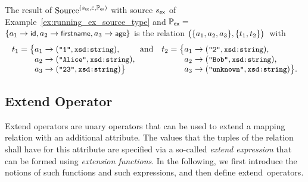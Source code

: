 \begin{example}
	\label{ex:source_operator}
	The result of $\textrm{Source}^{(s_\mathsf{ex},\varepsilon,\mathbb{P}_\mathsf{ex})}$ with
		source
	$s_\mathsf{ex}$ of Example~\ref{ex:running_ex_source_type} and
		$\mathbb{P}_\mathsf{ex} =$ $\{a_1 \rightarrow \textsf{\small id}, a_2 \rightarrow \textsf{\small firstname}, a_3 \rightarrow \textsf{\small age}\}$
	is the
	relation $\big(\{ a_1, a_2, a_3\}, \{t_1,t_2\}\big)$~with%
%
\vspace{-2mm} %
%
	\begin{align*}
		t_1 = \big\{
		& a_1 \rightarrow (\texttt{\small "1"}, \texttt{\small xsd:string}),
		\quad \text{~~~~and}
		&
		t_2 = \big\{
		& a_1 \rightarrow (\texttt{\small "2"}, \texttt{\small xsd:string}),
		\\[-1mm]
		& a_2 \rightarrow (\texttt{\small "Alice"}, \texttt{\small xsd:string}),
		&
		& a_2 \rightarrow (\texttt{\small "Bob"}, \texttt{\small xsd:string}),
		\\[-1.5mm]
		& a_3 \rightarrow  (\texttt{\small "23"}, \texttt{\small xsd:string}) \big\}
		&
		& a_3 \rightarrow (\texttt{\small "unknown"}, \texttt{\small xsd:string}) \big\}
		.
	\end{align*}
\end{example}


\vspace{-4mm} %
\enlargethispage{\baselineskip}%

\subsection{Extend Operator}%
\label{sub:extend_operator}

\vspace{-2mm} %

Extend operators are unary operators that
	can be used to
extend a mapping relation with an additional attribute. The values that the tuples of the relation shall have for this attribute are specified
	via
a so-called \emph{extend expression} that can be formed using \emph{extension functions}. In the following, we first introduce the notions of such functions and such expressions, and then define extend~operators.

